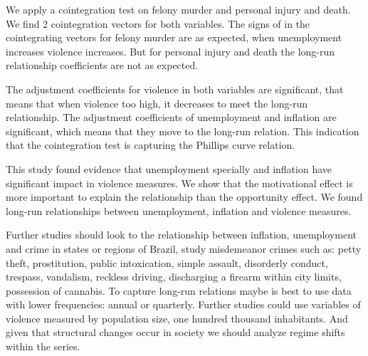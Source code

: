 \documentclass[11pt, a4paper]{article}
\begin{document}
We apply a cointegration test on felony murder and personal injury and death. We find  2 cointegration vectors for both variables. The signs of in the cointegrating vectors for felony murder are as expected, when unemployment increases violence increases. But for personal injury and death the long-run relationship coefficients are not as expected. 

The adjustment coefficients for violence in both variables are significant, that means that when violence too high, it decreases to meet the long-run relationship. The adjustment coefficients of unemployment and inflation are significant, which means that they move to the long-run relation. This indication that the cointegration test is capturing the Phillips curve relation. 

This study found evidence that unemployment specially and inflation have significant impact in violence measures. We show that the motivational effect is more important to explain the relationship than the opportunity effect. We found long-run relationships between unemployment, inflation and violence measures.

Further studies should look to the relationship between inflation, unemployment and crime in states or regions of Brazil, study misdemeanor crimes such as: petty theft, prostitution, public intoxication, simple assault, disorderly conduct, trespass, vandalism, reckless driving, discharging a firearm within city limits, possession of cannabis. To capture long-run relations maybe is best to use data with lower frequencies: annual or quarterly. Further studies could use variables of violence measured by population size, one hundred thousand inhabitants. And given that structural changes occur in society we should analyze regime shifts within the series. 









\begin{footnotesize}

\end{footnotesize}
\end{document}
